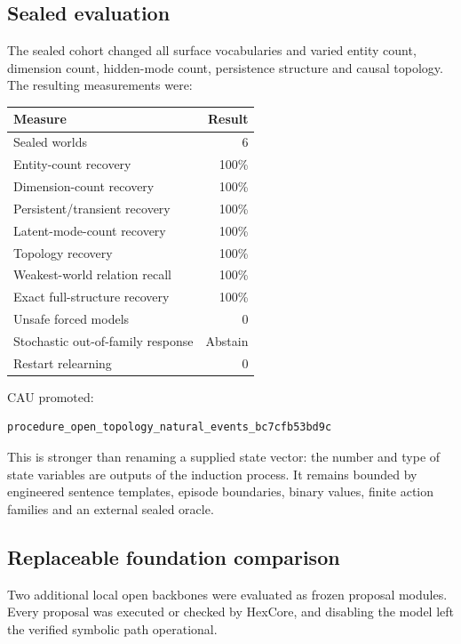 \subsection{Sealed evaluation}

The sealed cohort changed all surface vocabularies and varied entity count,
dimension count, hidden-mode count, persistence structure and causal topology.
The resulting measurements were:

\begin{center}
\begin{tabular}{lr}
\hline
Measure & Result \\
\hline
Sealed worlds & 6 \\
Entity-count recovery & 100\% \\
Dimension-count recovery & 100\% \\
Persistent/transient recovery & 100\% \\
Latent-mode-count recovery & 100\% \\
Topology recovery & 100\% \\
Weakest-world relation recall & 100\% \\
Exact full-structure recovery & 100\% \\
Unsafe forced models & 0 \\
Stochastic out-of-family response & Abstain \\
Restart relearning & 0 \\
\hline
\end{tabular}
\end{center}

CAU promoted:
\begin{verbatim}
procedure_open_topology_natural_events_bc7cfb53bd9c
\end{verbatim}

This is stronger than renaming a supplied state vector: the number and type of
state variables are outputs of the induction process.  It remains bounded by
engineered sentence templates, episode boundaries, binary values, finite
action families and an external sealed oracle.

\subsection{Replaceable foundation comparison}

Two additional local open backbones were evaluated as frozen proposal modules.
Every proposal was executed or checked by HexCore, and disabling the model left
the verified symbolic path operational.

